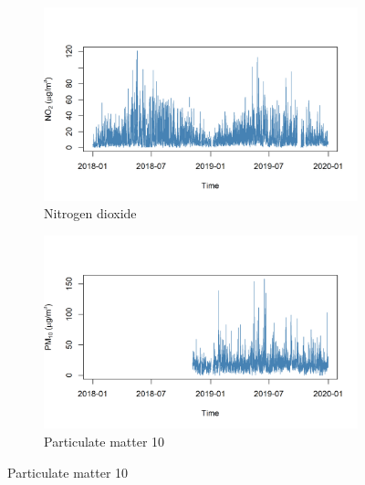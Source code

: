 \documentclass[a4paper, 10pt]{article}
\begin{document}
\begin{flushleft}
      \begin{figure}[H]
         \centering
         \begin{subfigure}{0.48\linewidth}
            \centering
            \includegraphics[width=\linewidth]{../img/extracted_no2.png}
         \caption{Nitrogen dioxide}
         \end{subfigure}
         \hfill
         \begin{subfigure}{0.48\linewidth}
            \centering
            \includegraphics[width=\linewidth]{../img/extracted_pm10.png}
            \caption{Particulate matter 10}
         \end{subfigure}
         
         \vspace{0.5em}


\end{figure}
\end{flushleft}
\end{document}
